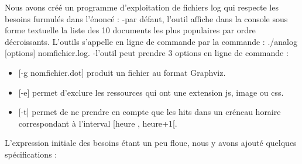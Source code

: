 \documentclass[a4paper]{article}
\begin{document}
	Nous avons créé un programme d'exploitation de fichiers log qui respecte les besoins furmulés dans l'énoncé :
	-par défaut, l'outil affiche dans la console sous forme textuelle la liste des 10 documents les plus populaires par ordre décroissants. L'outils s'appelle en ligne de commande par la commande : ./analog [options] nomfichier.log.
	-l'outil peut prendre 3 options en ligne de commande :\\
	\begin{itemize}
		\item{} [-g nomfichier.dot] produit un fichier au format Graphviz.
		\item{} [-e] permet d'exclure les ressources qui ont une extension js, image ou css.
		\item{} [-t] permet de ne prendre en compte que les hits dans un créneau horaire correspondant à l'interval [heure , heure+1[.
	\end{itemize}
	\bigbreak
	L'expression initiale des besoins étant un peu floue, nous y avons ajouté quelques spécifications :\\
\end{document}
